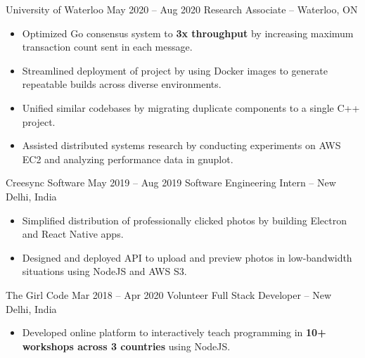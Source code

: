 \documentclass{article}
\begin{document}
\iffalse
Accelerated research in the field of Byzantine fault tolerant distributed computing, by implementing security features (like BLS signature verification), streamlining build and deployment of project using Docker, and reducing technical debt by standardizing use of external dependencies. Conducted performance benchmarks on AWS and analyzed performance data using gnuplot and Python.
\fi
\WorkEntry
{University of Waterloo}
{May 2020 -- Aug 2020}
{Research Associate -- Waterloo, ON}
{\begin{itemize} \itemsep -1pt
    \item Optimized Go consensus system to \textbf{3x throughput} by increasing maximum transaction count sent in each message.
    \item Streamlined deployment of project by using Docker images to generate repeatable builds across diverse environments.
    \item Unified similar codebases by migrating duplicate components to a single  C++ project.
    \item Assisted distributed systems research by conducting experiments on AWS EC2 and analyzing performance data in gnuplot.
    \end{itemize}}
\iffalse
Designed and build native apps for professional photographers to deliver photos to clients, using Electron and React Native, and created API to preview uploaded photos in low-bandwidth situations, using NodeJS and AWS S3. Reduced technical debt in React Native project by combining similar functionality into reusable components.
\fi
\WorkEntry
{Creesync Software}
{May 2019 -- Aug 2019}
{Software Engineering Intern -- New Delhi, India}
{\begin{itemize} \itemsep -1pt
    \item Simplified distribution of professionally clicked photos by building Electron and React Native apps.
    \item Designed and deployed API to upload and preview photos in low-bandwidth situations using NodeJS and AWS S3.
    \end{itemize}}
\WorkEntry
{The Girl Code}
{Mar 2018 -- Apr 2020}
{Volunteer Full Stack Developer -- New Delhi, India}
{\begin{itemize} \itemsep -1pt
	\item Developed online platform to interactively teach programming in \textbf{10+ workshops across 3 countries} using NodeJS.
    \end{itemize}}
\end{document}
